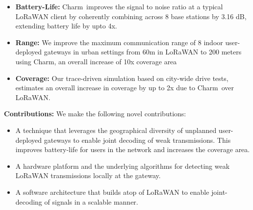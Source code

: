 \begin{itemize}
    \item {\bf Battery-Life: }Charm\ improves the signal to noise ratio at a typical LoRaWAN client by coherently combining across 8 base stations by 3.16 dB, extending battery life by upto 4x.
    \item {\bf Range: } We improve the maximum communication range of 8 indoor user-deployed gateways in urban settings from 60m in LoRaWAN to 200 meters using Charm, an overall increase of 10x coverage area 
    \item {\bf Coverage: } Our trace-driven simulation based on city-wide drive tests, estimates an overall increase in coverage by up to 2x due to Charm\ over LoRaWAN. 
\end{itemize}


\textbf{Contributions:} We make the following novel contributions:
\begin{itemize}
    \item A technique that leverages the geographical diversity of unplanned user-deployed gateways to enable joint decoding of weak transmissions. This improves battery-life for users in the network and increases the coverage area.
    \item A hardware platform and the underlying algorithms for detecting weak LoRaWAN transmissions locally at the gateway. 
    \item A software architecture that builds atop of LoRaWAN to enable joint-decoding of signals in a scalable manner.
\end{itemize}



















